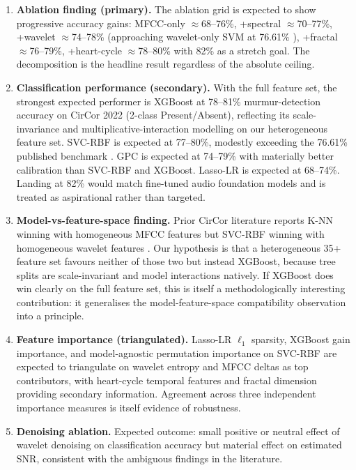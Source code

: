 \documentclass[10pt,twocolumn]{article}
\begin{document}
\begin{enumerate}
    \item \textbf{Ablation finding (primary).} The ablation grid is expected to show progressive accuracy gains: MFCC-only $\approx$68--76\%, +spectral $\approx$70--77\%, +wavelet $\approx$74--78\% (approaching wavelet-only SVM at 76.61\% \citep{wavelet2025}), +fractal $\approx$76--79\%, +heart-cycle $\approx$78--80\% with 82\% as a stretch goal. The decomposition is the headline result regardless of the absolute ceiling.

    \item \textbf{Classification performance (secondary).} With the full feature set, the strongest expected performer is XGBoost at 78--81\% murmur-detection accuracy on CirCor 2022 (2-class Present/Absent), reflecting its scale-invariance and multiplicative-interaction modelling on our heterogeneous feature set. SVC-RBF is expected at 77--80\%, modestly exceeding the 76.61\% published benchmark \citep{wavelet2025}. GPC is expected at 74--79\% with materially better calibration than SVC-RBF and XGBoost. Lasso-LR is expected at 68--74\%. Landing at 82\% would match fine-tuned audio foundation models and is treated as aspirational rather than targeted.

    \item \textbf{Model-vs-feature-space finding.} Prior CirCor literature reports K-NN winning with homogeneous MFCC features \citep{fuadah2023} but SVC-RBF winning with homogeneous wavelet features \citep{wavelet2025}. Our hypothesis is that a heterogeneous 35+ feature set favours neither of those two but instead XGBoost, because tree splits are scale-invariant and model interactions natively. If XGBoost does win clearly on the full feature set, this is itself a methodologically interesting contribution: it generalises the model-feature-space compatibility observation into a principle.

    \item \textbf{Feature importance (triangulated).} Lasso-LR $\ell_1$ sparsity, XGBoost gain importance, and model-agnostic permutation importance on SVC-RBF are expected to triangulate on wavelet entropy and MFCC deltas as top contributors, with heart-cycle temporal features and fractal dimension providing secondary information. Agreement across three independent importance measures is itself evidence of robustness.

    \item \textbf{Denoising ablation.} Expected outcome: small positive or neutral effect of wavelet denoising on classification accuracy but material effect on estimated SNR, consistent with the ambiguous findings in the literature.


\end{enumerate}
\end{document}
